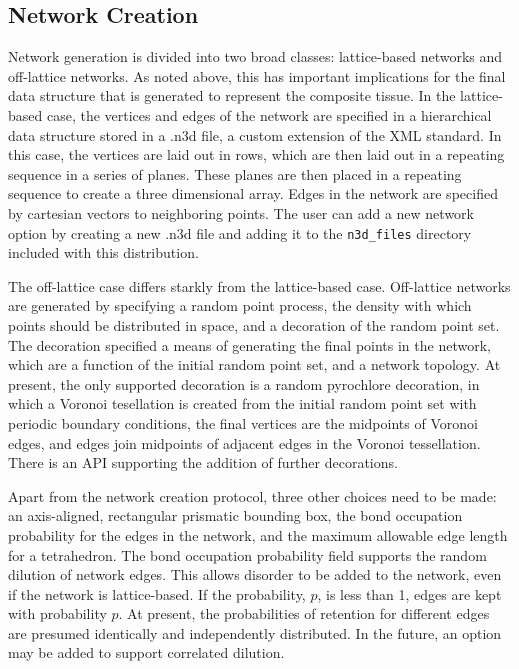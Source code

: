 \documentclass{article}
\begin{document}
\subsection{Network Creation}

Network generation is divided into two broad classes: lattice-based networks
and off-lattice networks. As noted above, this has important implications for
the final data structure that is generated to represent the composite tissue.
In the lattice-based case, the vertices and edges of the network are specified
in a hierarchical data structure stored in a .n3d file, a custom extension of
the XML standard. In this case, the vertices are laid out in rows, which are
then laid out in a repeating sequence in a series of planes. These planes
are then placed in a repeating sequence to create a three dimensional array.
Edges in the network are specified by cartesian vectors to neighboring points.
The user can add a new network option by creating a new .n3d file and adding it
to the \texttt{n3d\_files} directory included with this distribution.

The off-lattice case differs starkly from the lattice-based case. Off-lattice
networks are generated by specifying a random point process, the density
with which points should be distributed in space, and a decoration of the
random point set. The decoration specified a means of generating the final
points in the network, which are a function of the initial random point set,
and a network topology. At present, the only supported decoration is a random
pyrochlore decoration, in which a Voronoi tesellation is created from the
initial random point set with periodic boundary conditions, the final vertices
are the midpoints of Voronoi edges, and edges join midpoints of adjacent edges
in the Voronoi tessellation. There is an API supporting the addition of
further decorations.

Apart from the network creation protocol, three other choices need to be made:
an axis-aligned, rectangular prismatic bounding box, the bond occupation
probability for the edges in the network, and the maximum allowable edge length
for a tetrahedron. The bond occupation probability field supports the random
dilution of network edges. This allows disorder to be added to the network,
even if the network is lattice-based. If the probability, $p$, is less than
1, edges are  kept with probability $p$. At present, the probabilities of
retention for different edges are presumed identically and independently
distributed. In the future, an option may be added to support correlated
dilution.
\end{document}
